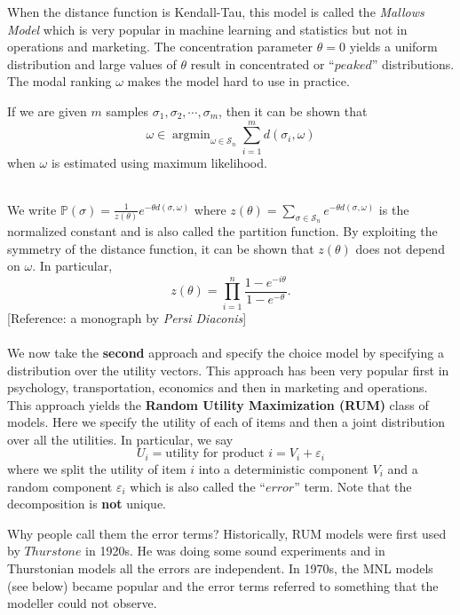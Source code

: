 \documentclass[11pt]{article}
\newcommand{\p}{\mathbb{P}}
\newenvironment{example}[2][Example]{\begin{trivlist}
\item[\hskip \labelsep {\bfseries #1}\hskip \labelsep {\bfseries #2.}]}{\end{trivlist}}
\DeclareMathOperator*{\argmin}{argmin}%
\begin{document}
\noindent When the distance function is Kendall-Tau, this model is called the \emph{Mallows Model} which is very popular in machine learning and statistics but not in operations and marketing. The concentration parameter $\theta=0$ yields a uniform distribution and large values of $\theta$ result in concentrated or ``$peaked$'' distributions. The modal ranking $\omega$ makes the model hard to use in practice.
\begin{tcolorbox}
\begin{example}[Example]
3 If we are given $m$ samples $\sigma_1,\sigma_2,\cdots,\sigma_m$, then it can be shown that
$$\omega\in\argmin_{\omega\in\mathscr{S}_n}\sum_{i=1}^md(\sigma_i,\omega)$$
when $\omega$ is estimated using maximum likelihood.
\end{example}
\end{tcolorbox}
\quad\\
We write $\p(\sigma)=\displaystyle\frac{1}{z(\theta)}e^{-\theta d(\sigma,\omega)}$ where $z(\theta)=\displaystyle\sum_{\sigma\in\mathscr{S}_n}e^{-\theta d(\sigma,\omega)}$ is the normalized constant and is also called the partition function. By exploiting the symmetry of the distance function, it can be shown that $z(\theta)$ does not depend on $\omega$. In particular,
$$z(\theta)=\prod_{i=1}^n\frac{1-e^{-i\theta}}{1-e^{-\theta}}.$$
[Reference: a monograph by {\em Persi Diaconis}]
\\ \\
We now take the \textbf{second} approach and specify the choice model by specifying a distribution over the utility vectors. This approach has been very popular first in psychology, transportation, economics and then in marketing and operations. This approach yields the \textbf{Random Utility Maximization (RUM)} class of models. Here we specify the utility of each of items and then a joint distribution over all the utilities. In particular, we say
$$U_i=\mbox{utility for product }i=V_i+\varepsilon_i$$
where we split the utility of item $i$ into a deterministic component $V_i$ and a random component $\varepsilon_i$ which is also called the ``$error$'' term. Note that the decomposition is \textbf{not} unique. 
\begin{tcolorbox}
Why people call them the error terms? Historically, RUM models were first used by $Thurstone$ in 1920s. He was doing some sound experiments and in Thurstonian models all the errors are independent. In 1970s, the MNL models (see below) became popular and the error terms referred to something that the modeller could not observe.
\end{tcolorbox}
\end{document}
